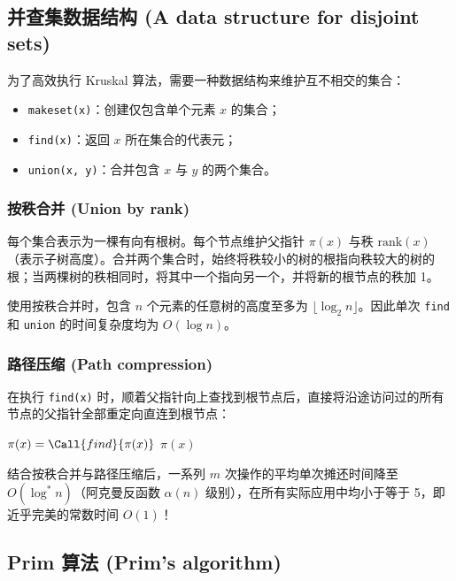 \subsection{并查集数据结构 (A data structure for disjoint sets)}

为了高效执行 Kruskal 算法，需要一种数据结构来维护互不相交的集合：
\begin{itemize}
    \item \texttt{makeset(x)}：创建仅包含单个元素 $x$ 的集合；
    \item \texttt{find(x)}：返回 $x$ 所在集合的代表元；
    \item \texttt{union(x, y)}：合并包含 $x$ 与 $y$ 的两个集合。
\end{itemize}

\subsubsection*{按秩合并 (Union by rank)}
每个集合表示为一棵有向有根树。每个节点维护父指针 $\pi(x)$ 与秩 $\text{rank}(x)$（表示子树高度）。合并两个集合时，始终将秩较小的树的根指向秩较大的树的根；当两棵树的秩相同时，将其中一个指向另一个，并将新的根节点的秩加 1。

\begin{property}
使用按秩合并时，包含 $n$ 个元素的任意树的高度至多为 $\lfloor \log_2 n \rfloor$。因此单次 \texttt{find} 和 \texttt{union} 的时间复杂度均为 $O(\log n)$。
\end{property}

\subsubsection*{路径压缩 (Path compression)}
在执行 \texttt{find(x)} 时，顺着父指针向上查找到根节点后，直接将沿途访问过的所有节点的父指针全部重定向直连到根节点：
\begin{algorithmic}[1]
        \State $\pi(x) = \Call{find}{\pi(x)}$
    \EndIf
    \State \Return $\pi(x)$
\EndFunction
\end{algorithmic}

结合按秩合并与路径压缩后，一系列 $m$ 次操作的平均单次摊还时间降至 $O(\log^* n)$（阿克曼反函数 $\alpha(n)$ 级别），在所有实际应用中均小于等于 5，即近乎完美的常数时间 $O(1)$！

\subsection{Prim 算法 (Prim's algorithm)}

